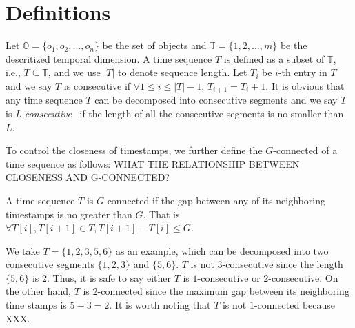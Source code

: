 \section{Definitions}
\label{sec:definition}
Let $\mathbb{O} = \{o_1 ,o_2,...,o_n\}$ be the set of objects and $\mathbb{T} =\{1,2,...,m\}$ be the descritized temporal dimension. A time sequence $T$ is defined as a subset of $\mathbb{T}$, i.e., $T \subseteq \mathbb{T}$, and we use $|T|$ to denote sequence length. Let $T_i$ be $i$-th entry in $T$ and we say $T$ is consecutive if $\forall 1\leq i\leq |T|-1$, $T_{i+1} = T_i + 1$. It is obvious that any time sequence $T$ can be decomposed into consecutive segments and we say $T$ is \textit{L-consecutive}~\cite{li2015platoon} if the length of all the consecutive segments is no smaller than $L$. 

To control the closeness of timestamps, we further define the $G$-connected of a time sequence as follows: WHAT THE RELATIONSHIP BETWEEN CLOSENESS AND G-CONNECTED?


%
%



\begin{definition}[$G$-connected]
A time sequence $T$ is $G$-connected if the gap between any of its neighboring timestamps is no greater than $G$. That is
 $\forall T[i],T[i+1] \in T, T[i+1]-T[i] \leq G$.
\end{definition}

We take $T=\{1,2,3,5,6\}$ as an example, which can be decomposed into two consecutive segments $\{1,2,3\}$ and $\{5,6\}$. $T$ is not $3$-consecutive since the length $\{5,6\}$ is $2$. Thus, it is safe to say either $T$ is $1$-consecutive or $2$-consecutive. On the other hand, $T$ is $2$-connected since the maximum gap between its neighboring time stamps is $5-3=2$. It is worth noting that $T$ is not $1$-connected because XXX.

